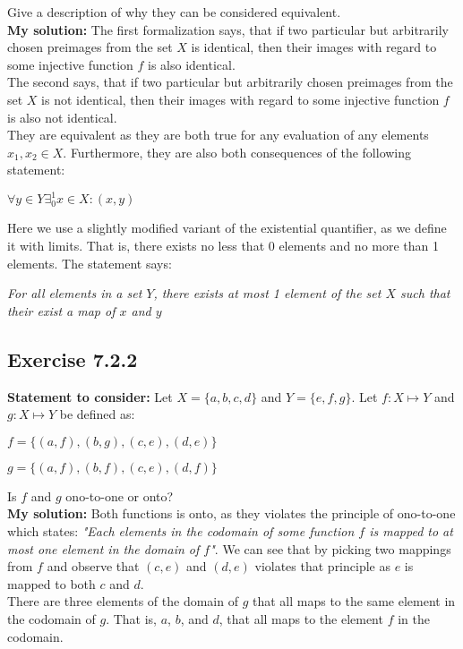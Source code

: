 \documentclass{report}
\newcommand{\cent}[1]{\begin{center}#1\end{center}}
\newcommand{\In}{\! \in \!}
\newcommand{\assignmentDescription}{\textbf{Statement to consider: }}
\newcommand{\solution}{\textbf{My solution: }}
\newcommand{\Exercise}[1]{\subsection{Exercise #1}}
\begin{document}
 	Give a description of why they can be considered equivalent.\\
 	
 	\solution
 	The first formalization says, that if two particular but arbitrarily chosen preimages from the set $X$ is identical, then their images with regard to some injective function $f$ is also identical.\\
 	
 	The second says, that if two particular but arbitrarily chosen preimages from the set $X$ is not identical, then their images with regard to some injective function $f$ is also not identical.\\
 	
 	They are equivalent as they are both true for any evaluation of any elements $x_1,x_2 \In X$. Furthermore, they are also both consequences of the following statement:
 	
 	\cent{$\forall y \In Y \exists_0^1 x \In X : (x,y)$} 	
 	 
 	 Here we use a slightly modified variant of the existential quantifier, as we define it with limits. That is, there exists no less that 0 elements and no more than 1 elements. The statement says:
 	 
 	 \begin{center}
 	 	\textit{For all elements in a set $Y$, there exists at most 1 element of the set $X$ such that their exist a map of  $x$  and $y$}
 	 \end{center}
 	
 	\Exercise{7.2.2}
 	
 	\assignmentDescription
 	Let $X = \{a,b,c,d\}$ and $Y = \{e,f,g\}$. Let $f : X \mapsto Y$ and $g : X \mapsto Y$ be defined as:
 	
 	\cent{$f = \{(a,f),(b,g),(c,e), (d,e)\}$}
 	\cent{$g = \{(a,f),(b,f),(c,e), (d,f)\}$}
 	
 	Is $f$ and $g$ ono-to-one or onto?\\
 	
 	\solution
 	Both functions is onto, as they violates the principle of ono-to-one which states: \textit{"Each elements in the codomain of some function $f$ is mapped to at most one element in the domain of $f$"}. We can see that by picking two mappings from $f$ and observe that $(c,e)$ and $(d,e)$ violates that principle as $e$ is mapped to both $c$ and $d$.\\
 	
 	There are three elements of the domain of $g$ that all maps to the same element in the codomain of $g$. That is, $a$, $b$, and $d$, that all maps to the element $f$ in the codomain.
 	
\end{document}

